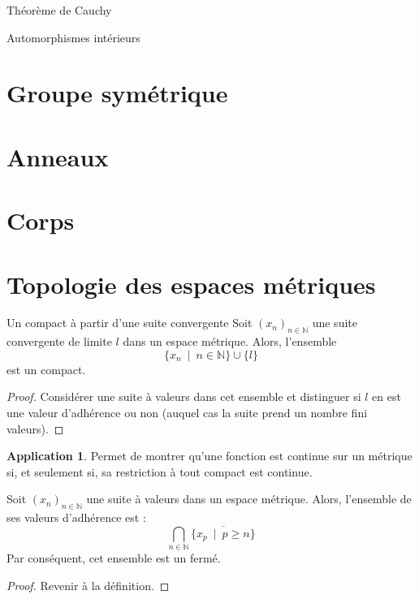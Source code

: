 \documentclass[french]{article}
\newcommand{\N}{\mathbb{N}}
\theoremstyle{definition}
\newtheorem*{app}{Application}
\begin{document}
\begin{lem}{Théorème de Cauchy}
	
\end{lem}

\begin{lem}{Automorphismes intérieurs}
	
\end{lem}

\section{Groupe symétrique}

\section{Anneaux}

\section{Corps}

\section{Topologie des espaces métriques}

\begin{lem}{Un compact à partir d'une suite convergente}
	Soit $(x_n)_{n\in\N}$ une suite convergente de limite $l$ dans un espace métrique. Alors, l'ensemble $$\{x_n\ \mid\ n\in\N\}\cup\{l\}$$ est un compact.
\end{lem}
\begin{proof}
	Considérer une suite à valeurs dans cet ensemble et distinguer si $l$ en est une valeur d'adhérence ou non (auquel cas la suite prend un nombre fini valeurs).
\end{proof}
\begin{app}
	Permet de montrer qu'une fonction est continue sur un métrique si, et seulement si, sa restriction à tout compact est continue.
\end{app}

\begin{lem}
	Soit $(x_n)_{n\in\N}$ une suite à valeurs dans un espace métrique. Alors, l'ensemble de ses valeurs d'adhérence est : $$\bigcap_{n\in\N}\overline{\{x_p\ \mid\ p\geqslant n\}}$$ Par conséquent, cet ensemble est un fermé.
\end{lem}
\begin{proof}
	Revenir à la définition.
\end{proof}
\end{document}
